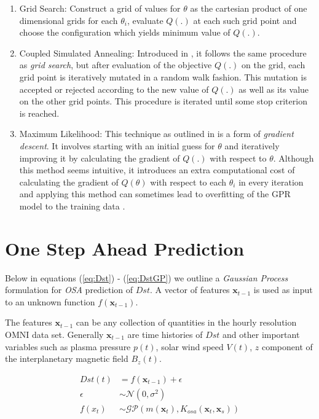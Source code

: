 \documentclass[sw, draft]{AGUTeX}
\begin{document}
\begin{article}
\begin{enumerate}
\item Grid Search: Construct a grid of values for $\theta$ as the cartesian product of one dimensional grids for each $\theta_i$, evaluate $Q(.)$ at each such grid point and choose the configuration which yields minimum value of $Q(.)$.

\item Coupled Simulated Annealing: Introduced in \citet{Xavier-De-Souza2010}, it follows the same procedure as \emph{grid search}, but after evaluation of the objective $Q(.)$ on the grid, each grid point is iteratively mutated in a random walk fashion. This mutation is accepted or rejected according to the new value of $Q(.)$ as well as its value on the other grid points. This procedure is iterated until some stop criterion is reached.

\item Maximum Likelihood: This technique as outlined in \citet{Rasmussen:2005:GPM:1162254} is a form of \emph{gradient descent}. It involves starting with an initial guess for $\theta$ and iteratively improving it by calculating the gradient of $Q(.)$ with respect to $\theta$. Although this method seems intuitive, it introduces an extra computational cost of calculating the gradient of $Q(\theta)$ with respect to each $\theta_i$ in every iteration and applying this method can sometimes lead to overfitting of the GPR model to the training data \citep{Rasmussen:2005:GPM:1162254}.

\end{enumerate}

\section{One Step Ahead Prediction} \label{sec:osa}

Below in equations (\ref{eq:Dst}) - (\ref{eq:DstGP}) we outline a \emph{Gaussian Process} formulation for \emph{OSA} prediction of $Dst$. A vector of features $\mathbf{x}_{t-1}$ is used as input to an unknown function $f(\mathbf{x}_{t-1})$.

The features $\mathbf{x}_{t-1}$ can be any collection of quantities in the hourly resolution OMNI data set. Generally $\mathbf{x}_{t-1}$ are time histories of $Dst$ and other important variables such as plasma pressure $p(t)$, solar wind speed $V(t)$, $z$ component of the interplanetary magnetic field $B_z(t)$.


\begin{align}
    Dst(t) & =  f(\mathbf{x}_{t-1}) + \epsilon \label{eq:Dst} \\
    \epsilon & \sim  \mathcal{N}(0, \sigma^2) \label{eq:GPNoise} \\
    f(x_t) & \sim  \mathcal{GP}(m(\mathbf{x}_t), K_{osa}(\mathbf{x}_t, \mathbf{x}_s)) \label{eq:DstGP} \\
\end{align}


\end{article}
\end{document}
